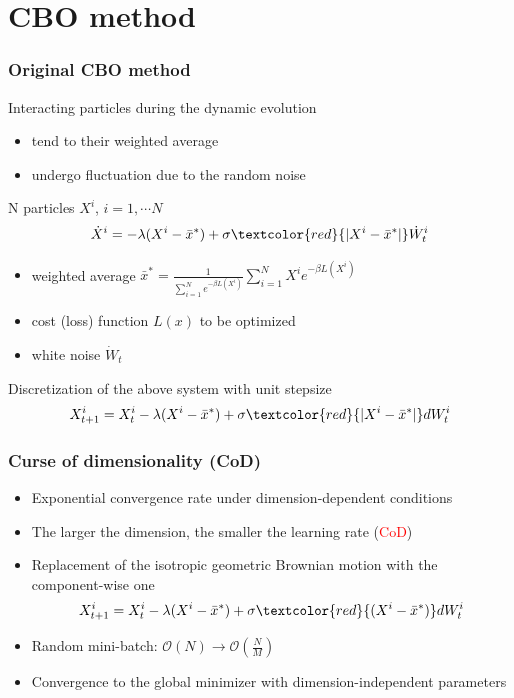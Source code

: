 \documentclass[aspectratio=169]{beamer}
\begin{document}
\section{CBO method}
\begin{frame}
	\frametitle{Original CBO method}
	
   Interacting particles during the dynamic evolution
   \begin{itemize}
   	\item tend to their weighted average
   	\item undergo fluctuation due to the random noise 
   \end{itemize}

	N particles $X^i$, $i =1, \cdots N$
   \begin{equation*}
   		\dot X^i = -\lambda (X^i - \bar{x}^*) +\sigma \textcolor{red}{|X^i-\bar{x}^*|} \dot W^i_t
   \end{equation*}
   \begin{itemize}
   	\item[] weighted average $\bar{x}^* = \frac{1}{\sum_{i=1}^N e^{-\beta L(X^i)}}\sum_{i=1}^N X^i e^{-\beta L(X^i)}$ 
   	\item[] cost (loss) function $L(x)$ to be optimized
   	\item[] white noise $\dot W_t$
   \end{itemize}
   Discretization of the above system with unit stepsize 
   \begin{equation*}
   		X^i_{t+1} =  X^i_{t} -\lambda (X^i - \bar{x}^*) +\sigma \textcolor{red}{|X^i-\bar{x}^*|}  dW^i_t
   \end{equation*}
\end{frame}

\begin{frame}
\frametitle{Curse of dimensionality (CoD)}

\begin{itemize}
	\item Exponential convergence rate under dimension-dependent conditions 
	\item The larger the dimension, the smaller the learning rate (\textcolor{red}{CoD})
	\item Replacement of the isotropic geometric Brownian motion with the component-wise one 
	\begin{equation*}
	X^i_{t+1} =  X^i_{t} -\lambda (X^i - \bar{x}^*) +\sigma \textcolor{red}{(X^i-\bar{x}^*)}  dW^i_t
	\end{equation*}
	\item[] Random mini-batch: $\mathcal{O}(N) \rightarrow \mathcal{O}(\frac{N}{M})$
	\item Convergence to the global minimizer with dimension-independent parameters 
\end{itemize}
\end{frame}
\end{document}
